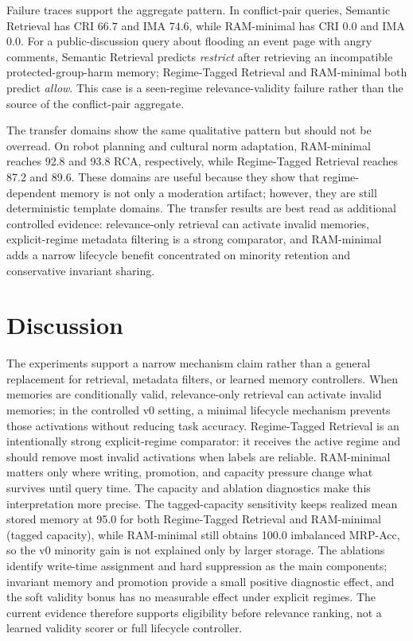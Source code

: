 \documentclass{article} %
\begin{document}
Failure traces support the aggregate pattern.
In conflict-pair queries, Semantic Retrieval has CRI $66.7$ and IMA $74.6$, while RAM-minimal has CRI $0.0$ and IMA $0.0$.
For a public-discussion query about flooding an event page with angry comments, Semantic Retrieval predicts \textit{restrict} after retrieving an incompatible protected-group-harm memory; Regime-Tagged Retrieval and RAM-minimal both predict \textit{allow}.
This case is a seen-regime relevance-validity failure rather than the source of the conflict-pair aggregate.

The transfer domains show the same qualitative pattern but should not be overread.
On robot planning and cultural norm adaptation, RAM-minimal reaches 92.8 and 93.8 RCA, respectively, while Regime-Tagged Retrieval reaches 87.2 and 89.6.
These domains are useful because they show that regime-dependent memory is not only a moderation artifact; however, they are still deterministic template domains.
The transfer results are best read as additional controlled evidence: relevance-only retrieval can activate invalid memories, explicit-regime metadata filtering is a strong comparator, and RAM-minimal adds a narrow lifecycle benefit concentrated on minority retention and conservative invariant sharing.

\section{Discussion}
\label{sec:discussion}

The experiments support a narrow mechanism claim rather than a general replacement for retrieval, metadata filters, or learned memory controllers.
When memories are conditionally valid, relevance-only retrieval can activate invalid memories; in the controlled v0 setting, a minimal lifecycle mechanism prevents those activations without reducing task accuracy.
Regime-Tagged Retrieval is an intentionally strong explicit-regime comparator: it receives the active regime and should remove most invalid activations when labels are reliable.
RAM-minimal matters only where writing, promotion, and capacity pressure change what survives until query time.
The capacity and ablation diagnostics make this interpretation more precise.
The tagged-capacity sensitivity keeps realized mean stored memory at 95.0 for both Regime-Tagged Retrieval and RAM-minimal (tagged capacity), while RAM-minimal still obtains 100.0 imbalanced MRP-Acc, so the v0 minority gain is not explained only by larger storage.
The ablations identify write-time assignment and hard suppression as the main components; invariant memory and promotion provide a small positive diagnostic effect, and the soft validity bonus has no measurable effect under explicit regimes.
The current evidence therefore supports eligibility before relevance ranking, not a learned validity scorer or full lifecycle controller.
\end{document}
